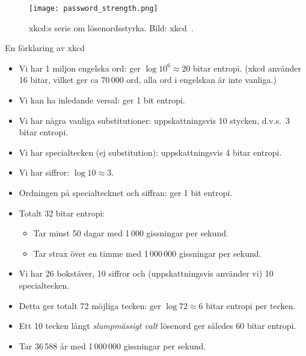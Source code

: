 \documentclass{beamer}
\begin{document}
\begin{frame}
  \begin{figure}
    \texttt{[image: password\_strength.png]}
    \caption{xkcd:s serie om lösenordsstyrka.
    Bild: xkcd~\cite{xkcd936}.}
  \end{figure}
\end{frame}

\begin{frame}{En förklaring av xkcd}
  \begin{itemize}
    \item Vi har 1 miljon engelska ord: ger \(\log 10^6 \approx 20\) bitar 
      entropi.
      (xkcd använder 16 bitar, vilket ger ca 70\,000 ord, alla ord i engelskan 
      är inte vanliga.)

    \item Vi kan ha inledande versal: ger 1 bit entropi.

    \item Vi har några vanliga substitutioner: uppskattningsvis 10 stycken, 
      d.v.s.~3 bitar entropi.

    \item Vi har specialtecken (ej substitution): uppskattningsvis 4 bitar 
      entropi.

    \item Vi har siffror: \(\log 10\approx 3\).

    \item Ordningen på specialtecknet och siffran: ger 1 bit entropi.

    \item Totalt 32 bitar entropi:
      \begin{itemize}
        \item Tar minst 50 dagar med 1\,000 gissningar per sekund.
        \item Tar strax över en timme med 1\,000\,000 gissningar per sekund.
      \end{itemize}

  \end{itemize}
\end{frame}

\begin{frame}
  \begin{example}
    \begin{itemize}
      \item Vi har 26 bokstäver, 10 siffror och (uppskattningsvis använder vi) 
        10 specialtecken.

      \item Detta ger totalt 72 möjliga tecken: ger \(\log 72\approx 6\) bitar 
        entropi per tecken.

      \item Ett 10 tecken långt \emph{slumpmässigt valt} lösenord ger således 
        60 bitar entropi.

      \item Tar 36\,588 år med 1\,000\,000 gissningar per sekund.

    \end{itemize}
  \end{example}
\end{frame}
\end{document}
